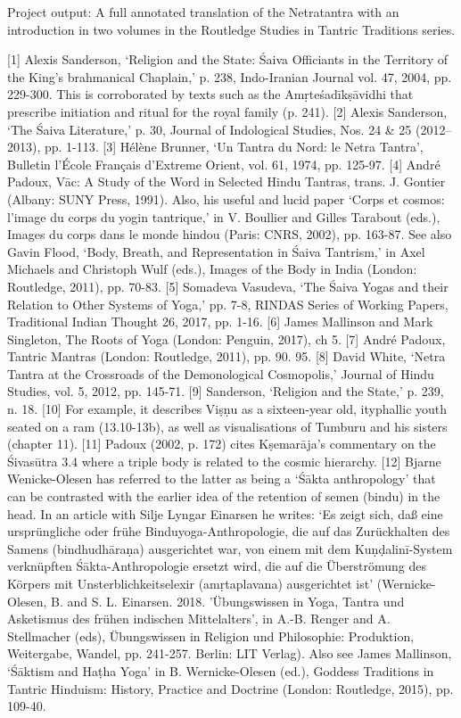 Project output:
A full annotated translation of the Netratantra with an introduction in two volumes in the Routledge Studies in Tantric Traditions series.

[1] Alexis Sanderson, ‘Religion and the State: Śaiva Officiants in the Territory of the King’s brahmanical Chaplain,’ p. 238, Indo-Iranian Journal vol. 47, 2004, pp. 229-300. This is corroborated by texts such as the Amṛteśadīkṣāvidhi that prescribe initiation and ritual for the royal family (p. 241).
[2] Alexis Sanderson, ‘The Śaiva Literature,’ p. 30, Journal of Indological Studies, Nos. 24 \& 25 (2012–2013), pp. 1-113.
[3] Hélène Brunner, ‘Un Tantra du Nord: le Netra Tantra’, Bulletin l’École Français d’Extreme Orient, vol. 61, 1974, pp. 125-97.
[4] André Padoux, Vāc: A Study of the Word in Selected Hindu Tantras, trans. J. Gontier (Albany: SUNY Press, 1991). Also, his useful and lucid paper ‘Corps et cosmos: l’image du corps du yogin tantrique,’ in V. Boullier and Gilles Tarabout (eds.), Images du corps dans le monde hindou (Paris: CNRS, 2002), pp. 163-87. See also Gavin Flood, ‘Body, Breath, and Representation in Śaiva Tantrism,’ in Axel Michaels and Christoph Wulf (eds.), Images of the Body in India (London: Routledge, 2011), pp. 70-83.
[5] Somadeva Vasudeva, ‘The Śaiva Yogas and their Relation to Other Systems of Yoga,’ pp. 7-8, RINDAS Series of Working Papers, Traditional Indian Thought 26, 2017, pp. 1-16.
[6] James Mallinson and Mark Singleton, The Roots of Yoga (London: Penguin, 2017), ch 5.
[7] André Padoux, Tantric Mantras (London: Routledge, 2011), pp. 90. 95.
[8] David White, ‘Netra Tantra at the Crossroads of the Demonological Cosmopolis,’ Journal of Hindu Studies, vol. 5, 2012, pp. 145-71.
[9] Sanderson, ‘Religion and the State,’ p. 239, n. 18.
[10] For example, it describes Viṣṇu as a sixteen-year old, ityphallic youth seated on a ram (13.10-13b), as well as visualisations of Tumburu and his sisters (chapter 11).
[11] Padoux (2002, p. 172) cites Kṣemarāja’s commentary on the Śivasūtra 3.4 where a triple body is related to the cosmic hierarchy.
[12] Bjarne Wenicke-Olesen has referred to the latter as being a ‘Śākta anthropology’ that can be contrasted with the earlier idea of the retention of semen (bindu) in the head. In an article with Silje Lyngar Einarsen he writes: ‘Es zeigt sich, daß eine ursprüngliche oder frühe Binduyoga-Anthropologie, die auf das Zurückhalten des Samens (bindhudhāraṇa) ausgerichtet war, von einem mit dem Kuṇḍalinī-System verknüpften Śākta-Anthropologie ersetzt wird, die auf die Überströmung des Körpers mit Unsterblichkeitselexir (amṛtaplavana) ausgerichtet ist’ (Wernicke-Olesen, B. and S. L. Einarsen. 2018. ’Übungswissen in Yoga, Tantra und Asketismus des frühen indischen Mittelalters’, in A.-B. Renger and A. Stellmacher (eds), Übungswissen in Religion und Philosophie: Produktion, Weitergabe, Wandel, pp. 241-257. Berlin: LIT Verlag). Also see James Mallinson, ‘Śāktism and Haṭha Yoga’ in B. Wernicke-Olesen (ed.), Goddess Traditions in Tantric Hinduism: History, Practice and Doctrine (London: Routledge, 2015), pp. 109-40.
